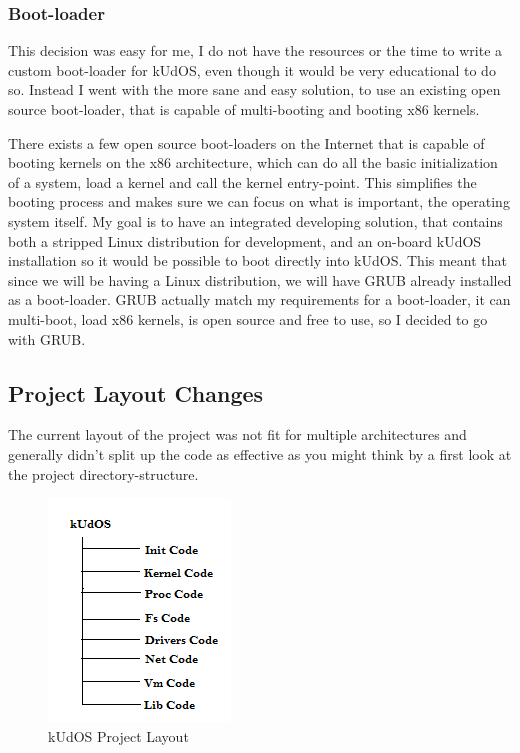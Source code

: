 \subsubsection{Boot-loader}

This decision was easy for me, I do not have the resources or the time to write a custom boot-loader for kUdOS, even though it would be very educational to do so. Instead I went with the more sane and easy solution, to use an existing open source boot-loader, that is capable of multi-booting and booting x86 kernels.

There exists a few open source boot-loaders on the Internet that is capable of booting kernels on the x86 architecture, which can do all the basic initialization of a system, load a kernel and call the kernel entry-point. This simplifies the booting process and makes sure we can focus on what is important, the operating system itself. 
My goal is to have an integrated developing solution, that contains both a stripped Linux distribution for development, and an on-board kUdOS installation so it would be possible to boot directly into kUdOS. This meant that since we will be having a Linux distribution, we will have GRUB already installed as a boot-loader. GRUB actually match my requirements for a boot-loader, it can multi-boot, load x86 kernels, is open source and free to use, so I decided to go with GRUB.

\subsection{Project Layout Changes}

The current layout of the project was not fit for multiple architectures and generally didn't split up the code as effective as you might think by a first look at the project directory-structure.

\begin{figure}[h]
    \centering
    \includegraphics{DirectoryLayoutBegin.png}
    \caption{kUdOS Project Layout}
    \label{fig:code_layout_end}
\end{figure}

